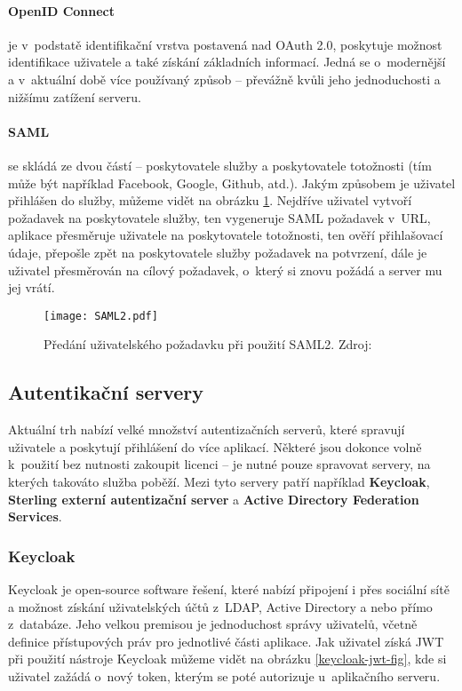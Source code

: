 \paragraph{OpenID Connect} je v~podstatě identifikační vrstva postavená nad OAuth 2.0, poskytuje možnost identifikace uživatele a také získání základních informací. Jedná se o~modernější a v~aktuální době více používaný způsob -- převážně kvůli jeho jednoduchosti a nižšímu zatížení serveru. \cite{oidc}

\paragraph{SAML} se skládá ze dvou částí -- poskytovatele služby a poskytovatele totožnosti (tím může být například Facebook, Google, Github, atd.). Jakým způsobem je uživatel přihlášen do služby, můžeme vidět na obrázku \ref{saml2}. Nejdříve uživatel vytvoří požadavek na poskytovatele služby, ten vygeneruje SAML požadavek v~URL, aplikace přesměruje uživatele na poskytovatele totožnosti, ten ověří přihlašovací údaje, přepošle zpět na poskytovatele služby požadavek na potvrzení, dále je uživatel přesměrován na cílový požadavek, o~který si znovu požádá a server mu jej vrátí. \cite{saml}
\begin{figure}[!htp]
\centering
\texttt{[image: SAML2.pdf]}
\caption[Předání uživatelského požadavku při použití SAML2]{Předání uživatelského požadavku při použití SAML2. Zdroj: \cite{saml}}
\label{saml2}
\end{figure}
\newpage
\subsection{Autentikační servery} \label{auth-server}
\par Aktuální trh nabízí velké množství autentizačních serverů, které spravují uživatele a poskytují přihlášení do více aplikací. Některé jsou dokonce volně k~použití bez nutnosti zakoupit licenci -- je nutné pouze spravovat servery, na kterých takováto služba poběží. Mezi tyto servery patří například \textbf{Keycloak}, \textbf{Sterling externí autentizační server} a \textbf{Active Directory Federation Services}.

\subsubsection{Keycloak} 
\par Keycloak je open-source software řešení, které nabízí připojení i přes sociální sítě a možnost získání uživatelských účtů z~LDAP, Active Directory a nebo přímo z~databáze. Jeho velkou premisou je jednoduchost správy uživatelů, včetně definice přístupových práv pro jednotlivé části aplikace. \cite{keycloak} Jak uživatel získá JWT při použití nástroje Keycloak můžeme vidět na obrázku \ref{keycloak-jwt-fig}, kde si uživatel zažádá o~nový token, kterým se poté autorizuje u~aplikačního serveru.

